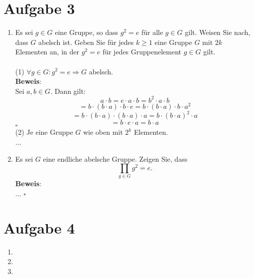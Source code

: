\documentclass[11pt,a4paper,ngerman]{article}
\begin{document}
\section*{Aufgabe 3}
\begin{enumerate}[\bfseries a)]
\item Es sei $g \in G$ eine Gruppe, so dass $g^2 = e$ für alle $g \in G$ gilt. Weisen Sie nach, dass $G$ abelsch ist. Geben Sie für jedes $k \geq 1$ eine Gruppe $G$ mit $2k$ Elementen an, in der $g^2 = e$ für jedes Gruppenelement $g \in G$ gilt.
\\ \\
(1) $\forall g \in G: g^2 = e \Rightarrow G$ abelsch. \\
\textbf{Beweis}: \\
Sei $a,b \in G$. Dann gilt:
$$ a \cdot b = e \cdot a \cdot b = b^2 \cdot a \cdot b $$
$$ = b \cdot (b \cdot a) \cdot b \cdot e = b \cdot (b \cdot a) \cdot b \cdot a^2 $$
$$ = b \cdot (b \cdot a) \cdot  (b \cdot a) \cdot a = b \cdot (b \cdot a)^2 \cdot a $$
$$ = b \cdot e \cdot a = b \cdot a$$
\mbox{} \hfill $\square$
\\
(2) Je eine Gruppe $G$ wie oben mit $2^k$ Elementen. \\
...
\item Es sei $G$ eine endliche abelsche Gruppe. Zeigen Sie, dass 
$$ \prod_{g\in G}g^2 = e.$$
\textbf{Beweis}: \\
...
\mbox{} \hfill $\square$
\end{enumerate}

\section*{Aufgabe 4}
\begin{enumerate}[\bfseries a)]
\item

\item


\item

\end{enumerate}

\label{LastPage}
\end{document}
